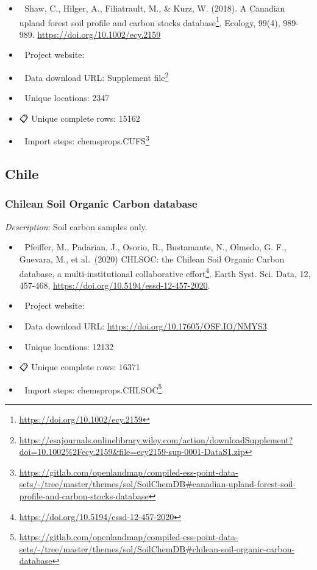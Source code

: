 \documentclass[
  graybox,natbib,nospthms]{svmono}
\providecommand{\tightlist}{%
  \setlength{\itemsep}{0pt}\setlength{\parskip}{0pt}}
\providecommand{\tightlist}{\setlength{\itemsep}{0pt}\setlength{\parskip}{0pt}}
\renewcommand{\href}[2]{#2 (\url{#1})}
\renewcommand{\href}[2]{#2\footnote{\url{#1}}}
\begin{document}
\begin{itemize}
\tightlist
\item
  📕 Shaw, C., Hilger, A., Filiatrault, M., \& Kurz, W. (2018). \href{https://doi.org/10.1002/ecy.2159}{A Canadian upland forest soil profile and carbon stocks database}. Ecology, 99(4), 989-989. \url{https://doi.org/10.1002/ecy.2159}
\item
  🔗 Project website:\\
\item
  📂 Data download URL: \href{https://esajournals.onlinelibrary.wiley.com/action/downloadSupplement?doi=10.1002\%2Fecy.2159\&file=ecy2159-sup-0001-DataS1.zip}{Supplement file}\\
\item
  📍 Unique locations: 2347\\
\item
  📋 Unique complete rows: 15162\\
\item
  📝 Import steps: \href{https://gitlab.com/openlandmap/compiled-ess-point-data-sets/-/tree/master/themes/sol/SoilChemDB\#canadian-upland-forest-soil-profile-and-carbon-stocks-database}{chemsprops.CUFS}
\end{itemize}

\hypertarget{chile}{%
\subsection{Chile}\label{chile}}

\hypertarget{chilean-soil-organic-carbon-database}{%
\subsubsection{Chilean Soil Organic Carbon database}\label{chilean-soil-organic-carbon-database}}

\emph{Description}: Soil carbon samples only.

\begin{itemize}
\tightlist
\item
  📕 Pfeiffer, M., Padarian, J., Osorio, R., Bustamante, N., Olmedo, G. F., Guevara, M., et al.~(2020) \href{https://doi.org/10.5194/essd-12-457-2020}{CHLSOC: the Chilean Soil Organic Carbon database, a multi-institutional collaborative effort}. Earth Syst. Sci. Data, 12, 457-468, \url{https://doi.org/10.5194/essd-12-457-2020}.\\
\item
  🔗 Project website:\\
\item
  📂 Data download URL: \url{https://doi.org/10.17605/OSF.IO/NMYS3}\\
\item
  📍 Unique locations: 12132\\
\item
  📋 Unique complete rows: 16371\\
\item
  📝 Import steps: \href{https://gitlab.com/openlandmap/compiled-ess-point-data-sets/-/tree/master/themes/sol/SoilChemDB\#chilean-soil-organic-carbon-database}{chemsprops.CHLSOC}
\end{itemize}
\end{document}
